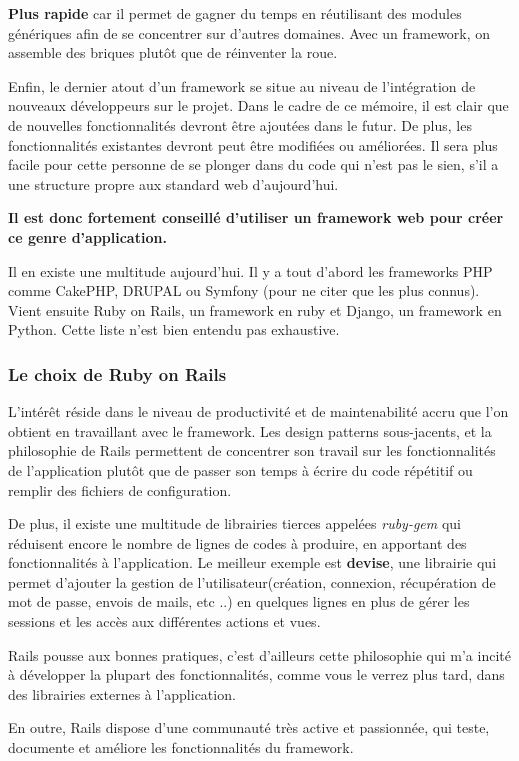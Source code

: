 \textbf{Plus rapide} car il permet de gagner du temps en réutilisant des modules génériques afin de se concentrer sur d'autres domaines. Avec un framework, on assemble des briques plutôt que de réinventer la roue. 

Enfin, le dernier atout d'un framework se situe au niveau de l'intégration de nouveaux développeurs sur le projet. Dans le cadre de ce mémoire, il est clair que de nouvelles fonctionnalités devront être ajoutées dans le futur. De plus, les fonctionnalités existantes devront peut être modifiées ou améliorées. Il sera plus facile pour cette personne de se plonger dans du code qui n'est pas le sien, s'il a une structure propre aux standard web d'aujourd'hui.

\textbf{Il est donc fortement conseillé d'utiliser un framework web pour créer ce genre d'application.} 

Il en existe une multitude aujourd'hui. Il y a tout d'abord les frameworks PHP comme CakePHP, DRUPAL ou Symfony (pour ne citer que les plus connus). Vient ensuite Ruby on Rails, un framework en ruby et Django, un framework en Python. Cette liste n'est bien entendu pas exhaustive. 
\subsubsection{Le choix de Ruby on Rails}
L'intérêt réside dans le niveau de productivité et de maintenabilité accru que l'on obtient en travaillant avec le framework. Les design patterns sous-jacents, et la philosophie de Rails permettent de concentrer son travail sur les fonctionnalités de l'application plutôt que de passer son temps à écrire du code répétitif ou remplir des fichiers de configuration. 

De plus, il existe une multitude de librairies tierces appelées \textit{ruby-gem} qui réduisent encore le nombre de lignes de codes à produire, en apportant des fonctionnalités à l'application. Le meilleur exemple est \textbf{devise}, une librairie qui permet d'ajouter la gestion de l'utilisateur(création, connexion, récupération de mot de passe, envois de mails, etc ..) en quelques lignes en plus de gérer les sessions et les accès aux différentes actions et vues. 

Rails pousse aux bonnes pratiques, c'est d'ailleurs cette philosophie qui m'a incité à développer la plupart des fonctionnalités, comme vous le verrez plus tard, dans des librairies externes à l'application.


En outre, Rails dispose d'une communauté très active et passionnée, qui teste, documente et améliore les fonctionnalités du framework. 

